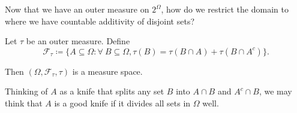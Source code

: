 Now that we have an outer measure on $2^{\Omega}$, how do we restrict the domain to where we have countable additivity of disjoint sets?

\begin{theorem}
	Let $\tau$ be an outer measure. Define \[
		\mathscr{F}_\tau \coloneqq \{A \subseteq \Omega: \forall\ B \subseteq  \Omega, \tau(B) = \tau(B \cap A) + \tau(B \cap A^{c})\}
	.\]

	Then $\left( \Omega, \mathscr{F}_\tau, \tau \right)$ is a measure space.
\end{theorem}

Thinking of $A$ as a knife that splits any set $B$ into $A\cap B$ and $A^{c} \cap B$, we may think that $A$ is a good knife if it divides all sets in $\Omega$ well.

